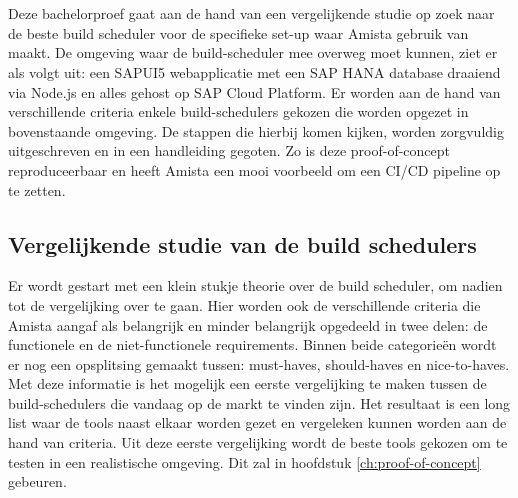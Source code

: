 
\chapter{}
\label{ch:methodologie}

Deze bachelorproef gaat aan de hand van een vergelijkende studie op zoek naar de beste build scheduler voor de specifieke set-up waar Amista gebruik van maakt. De omgeving waar de build-scheduler mee overweg moet kunnen, ziet er als volgt uit: een SAPUI5 webapplicatie met een SAP HANA database draaiend via Node.js en alles gehost op SAP Cloud Platform. Er worden aan de hand van verschillende criteria enkele build-schedulers gekozen die worden opgezet in bovenstaande omgeving. De stappen die hierbij komen kijken, worden zorgvuldig uitgeschreven en in een handleiding gegoten. Zo is deze proof-of-concept reproduceerbaar en heeft Amista een mooi voorbeeld om een CI/CD pipeline op te zetten.

    \section{Vergelijkende studie van de build schedulers}
    Er wordt gestart met een klein stukje theorie over de build scheduler, om nadien tot de vergelijking over te gaan. Hier worden ook de verschillende criteria die Amista aangaf als belangrijk en minder belangrijk opgedeeld in twee delen: de functionele en de niet-functionele requirements. Binnen beide categorieën wordt er nog een opsplitsing gemaakt tussen: must-haves, should-haves en nice-to-haves.
    Met deze informatie is het mogelijk een eerste vergelijking te maken tussen de build-schedulers die vandaag op de markt te vinden zijn. Het resultaat is een long list waar de tools naast elkaar worden gezet en vergeleken kunnen worden aan de hand van criteria. 
    Uit deze eerste vergelijking wordt de beste tools gekozen om te testen in een realistische omgeving. Dit zal in hoofdstuk \ref{ch:proof-of-concept} gebeuren.

